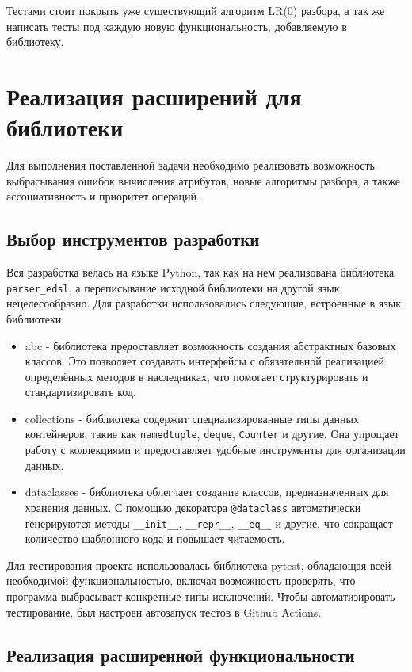 \documentclass[14pt, russian]{scrartcl}
\begin{document}
Тестами стоит покрыть уже существующий алгоритм LR(0) разбора, а так же написать тесты под каждую новую функциональность,
добавляемую в библиотеку.

\section{Реализация расширений для библиотеки}

Для выполнения поставленной задачи необходимо реализовать возможность выбрасывания ошибок вычисления атрибутов,
новые алгоритмы разбора, а также ассоциативность и приоритет операций.

\subsection{Выбор инструментов разработки}

Вся разработка велась на языке Python, так как на нем реализована библиотека \texttt{parser\_edsl}, а переписывание
исходной библиотеки на другой язык нецелесообразно. Для разработки использовались следующие, встроенные в
язык библиотеки:

\begin{itemize}
	\item abc - библиотека предоставляет возможность создания абстрактных базовых классов. Это позволяет
	создавать интерфейсы с обязательной реализацией определённых методов в
	наследниках, что помогает структурировать и стандартизировать код.
	\item collections - библиотека содержит специализированные типы данных контейнеров, такие как
	\texttt{namedtuple}, \texttt{deque}, \texttt{Counter} и другие. Она упрощает работу с коллекциями и
	предоставляет удобные инструменты для организации данных.
	\item dataclasses - библиотека облегчает создание классов, предназначенных для хранения данных. С помощью
	декоратора \texttt{@dataclass} автоматически генерируются методы \texttt{\_\_init\_\_}, \texttt{\_\_repr\_\_},
	\texttt{\_\_eq\_\_} и другие, что сокращает количество шаблонного кода и повышает читаемость.
\end{itemize}

Для тестирования проекта использовалась библиотека pytest, обладающая всей необходимой функциональностью, включая
возможность проверять, что программа выбрасывает конкретные типы исключений. Чтобы автоматизировать тестирование,
был настроен автозапуск тестов в Github Actions.

\subsection{Реализация расширенной функциональности}
\end{document}
